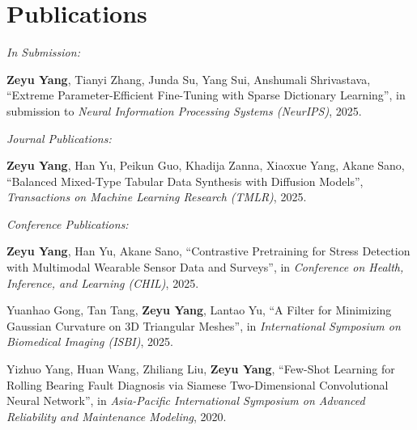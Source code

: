 \documentclass[11pt]{article}
\begin{document}
\section*{Publications}

\textit{In Submission:}

\begin{enumerate}[label={[\arabic*]}]
    \item \label{anshu-lluf} \textbf{Zeyu Yang}, Tianyi Zhang, Junda Su, Yang Sui, Anshumali Shrivastava, ``Extreme Parameter-Efficient Fine-Tuning with Sparse Dictionary Learning'', in submission to \textit{Neural Information Processing Systems (NeurIPS)}, 2025.
\end{enumerate}

\vspace{\lineskip}

\textit{Journal Publications:}

\begin{enumerate}[resume, label={[\arabic*]}]
    \item \label{akane-ddpm} \textbf{Zeyu Yang}, Han Yu, Peikun Guo, Khadija Zanna, Xiaoxue Yang, Akane Sano,
    ``Balanced Mixed-Type Tabular Data Synthesis with Diffusion Models'', \textit{Transactions on Machine Learning Research (TMLR)}, 2025.
\end{enumerate}

\vspace{\lineskip}
    
\textit{Conference Publications:}

\begin{enumerate}[resume, label={[\arabic*]}]
    \item \label{akane-clsp} \textbf{Zeyu Yang}, Han Yu, Akane Sano, ``Contrastive Pretraining for Stress Detection with Multimodal Wearable Sensor Data and Surveys'', in \textit{Conference on Health, Inference, and Learning (CHIL)}, 2025.
    \item Yuanhao Gong, Tan Tang, \textbf{Zeyu Yang}, Lantao Yu, ``A Filter for Minimizing Gaussian Curvature on 3D Triangular Meshes'', in \textit{International Symposium on Biomedical Imaging (ISBI)}, 2025.
    \item Yizhuo Yang, Huan Wang, Zhiliang Liu, \textbf{Zeyu Yang}, 
    ``Few-Shot Learning for Rolling Bearing Fault Diagnosis via Siamese Two-Dimensional Convolutional Neural Network'', 
    in \textit{Asia-Pacific International Symposium on Advanced Reliability and Maintenance Modeling}, 2020.
\end{enumerate}
\end{document}

